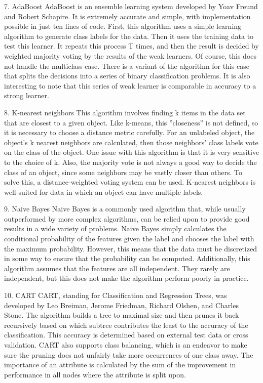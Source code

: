 7. AdaBoost  AdaBoost is an ensemble learning system developed by Yoav
Freund and Robert Schapire. It is extremely accurate and
simple, with implementation possible in just ten lines of code.
First, this algorithm uses a simple learning algorithm to generate
class labels for the data. Then it uses the training data to
test this learner. It repeats this process T times, and then the
result is decided by weighted majority voting by the results of
the weak learners. Of course, this does not handle the multiclass
case. There is a variant of the algorithm for this case
that splits the decisions into a series of binary classification
problems. It is also interesting to note that this series of weak
learner is comparable in accuracy to a strong learner.

8. K-nearest neighbors  This algorithm involves finding k items 
in the data set that
are closest to a given object. Like k-means, this ”closeness”
is not defined, so it is necessary to choose a distance metric
carefully. For an unlabeled object, the object’s k nearest
neighbors are calculated, then those neighbors’ class labels
vote on the class of the object. One issue with this algorithm
is that it is very sensitive to the choice of k. Also, the majority
vote is not always a good way to decide the class of an object,
since some neighbors may be vastly closer than others. To
solve this, a distance-weighted voting system can be used.
K-nearest neighbors is well-suited for data in which an object
can have multiple labels.

9. Naive Bayes  Naive Bayes is a commonly used algorithm that, while usually
outperformed by more complex algorithms, can be relied
upon to provide good results in a wide variety of problems.
Naive Bayes simply calculates the conditional probability of
the features given the label and chooses the label with the
maximum probability. However, this means that the data must
be discretized in some way to ensure that the probability can
be computed. Additionally, this algorithm assumes that the
features are all independent. They rarely are independent, but
this does not make the algorithm perform poorly in practice.

10. CART  CART, standing for Classification and Regression Trees, was
developed by Leo Breiman, Jerome Friedman, Richard Olshen,
and Charles Stone. The algorithm builds a tree to maximal
size and then prunes it back recursively based on which
subtree contributes the least to the accuracy of the classification.
This accuracy is determined based on external test data or
cross validation. CART also supports class balancing, which
is an endeavor to make sure the pruning does not unfairly
take more occurrences of one class away. The importance of
an attribute is calculated by the sum of the improvement in
performance in all nodes where the attribute is split upon.

